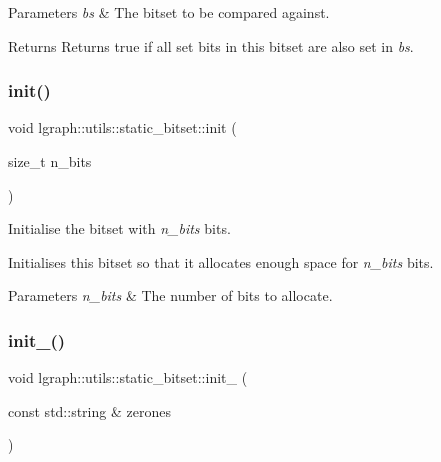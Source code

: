 \begin{DoxyParams}{Parameters}
{\em bs} & The bitset to be compared against. \\
\hline
\end{DoxyParams}
\begin{DoxyReturn}{Returns}
Returns true if all set bits in this bitset are also set in {\itshape bs}. 
\end{DoxyReturn}
\mbox{\label{classlgraph_1_1utils_1_1static__bitset_afad1ede9e08c9d59b641150d2203edca}} 
\subsubsection{\texorpdfstring{init()}{init()}}
{\footnotesize\ttfamily void lgraph\+::utils\+::static\+\_\+bitset\+::init (\begin{DoxyParamCaption}\item[{size\+\_\+t}]{n\+\_\+bits }\end{DoxyParamCaption})}



Initialise the bitset with {\itshape n\+\_\+bits} bits. 

Initialises this bitset so that it allocates enough space for {\itshape n\+\_\+bits} bits.


\begin{DoxyParams}{Parameters}
{\em n\+\_\+bits} & The number of bits to allocate. \\
\hline
\end{DoxyParams}
\mbox{\label{classlgraph_1_1utils_1_1static__bitset_ab94cca3ec07c19d17a205eb486fc6cdd}} 
\subsubsection{\texorpdfstring{init\+\_()}{init\_01()}\hspace{0.1cm}{\footnotesize\ttfamily [1/2]}}
{\footnotesize\ttfamily void lgraph\+::utils\+::static\+\_\+bitset\+::init\+\_ (\begin{DoxyParamCaption}\item[{const std\+::string \&}]{zerones }\end{DoxyParamCaption})}



